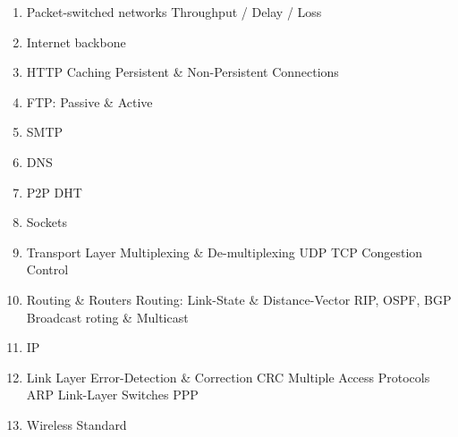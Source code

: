 \begin{enumerate}
    \item Packet-switched networks
        \subitem Throughput / Delay / Loss
    \item Internet backbone
    \item HTTP
        \subitem Caching
        \subitem Persistent \& Non-Persistent Connections
    \item FTP: Passive \& Active
    \item SMTP
    \item DNS
    \item P2P
        \subitem DHT
    \item Sockets
    \item Transport Layer
        \subitem Multiplexing \& De-multiplexing
        \subitem UDP
        \subitem TCP
        \subitem Congestion Control
    \item Routing \& Routers
        \subitem Routing: Link-State \& Distance-Vector
        \subitem RIP, OSPF, BGP
        \subitem Broadcast roting \& Multicast
    \item IP
    \item Link Layer
        \subitem Error-Detection \& Correction
        \subitem CRC
        \subitem Multiple Access Protocols
        \subitem ARP
        \subitem Link-Layer Switches
        \subitem PPP
    \item Wireless
         Standard
        \subitem 
\end{enumerate}

